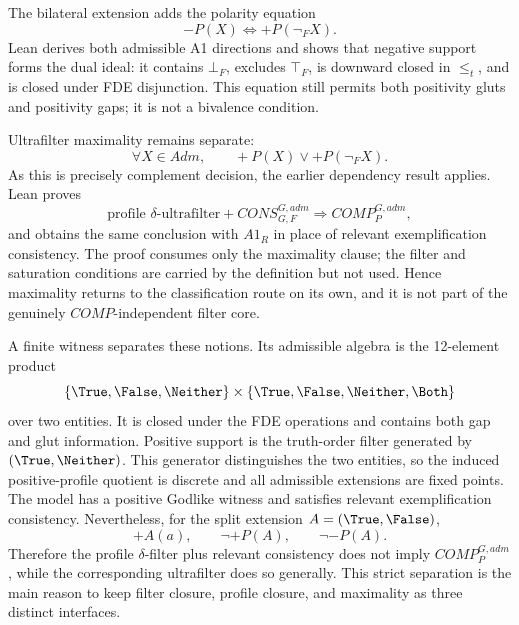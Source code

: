 The bilateral extension adds the polarity equation
\[
  -P(X)\Longleftrightarrow +P(\neg_FX).
\]
Lean derives both admissible A1 directions and shows that negative support forms the dual ideal: it contains \(\bot_F\), excludes \(\top_F\), is downward closed in \(\leq_t\), and is closed under FDE disjunction. This equation still permits both positivity gluts and positivity gaps; it is not a bivalence condition.

Ultrafilter maximality remains separate:
\[
  \forall X\in Adm,
  \qquad
  +P(X)\lor +P(\neg_FX).
\]
As this is precisely complement decision, the earlier dependency result applies. Lean proves
\[
\boxed{
  \text{profile }\delta\text{-ultrafilter}
  +CONS_{G,F}^{G,adm}
  \Longrightarrow
  COMP_P^{G,adm},
}
\]
and obtains the same conclusion with \(A1_R\) in place of relevant exemplification consistency. The proof consumes only the maximality clause; the filter and saturation conditions are carried by the definition but not used. Hence maximality returns to the classification route on its own, and it is not part of the genuinely \(COMP\)-independent filter core.

A finite witness separates these notions. Its admissible algebra is the 12-element product
\[
  \{\True,\False,\Neither\}
  \times
  \{\True,\False,\Neither,\Both\}
\]
over two entities. It is closed under the FDE operations and contains both gap and glut information. Positive support is the truth-order filter generated by \((\True,\Neither)\). This generator distinguishes the two entities, so the induced positive-profile quotient is discrete and all admissible extensions are fixed points. The model has a positive Godlike witness and satisfies relevant exemplification consistency. Nevertheless, for the split extension \(A=(\True,\False)\),
\[
  +A(a),
  \qquad
  \neg +P(A),
  \qquad
  \neg -P(A).
\]
Therefore the profile \(\delta\)-filter plus relevant consistency does not imply \(COMP_P^{G,adm}\), while the corresponding ultrafilter does so generally. This strict separation is the main reason to keep filter closure, profile closure, and maximality as three distinct interfaces.
